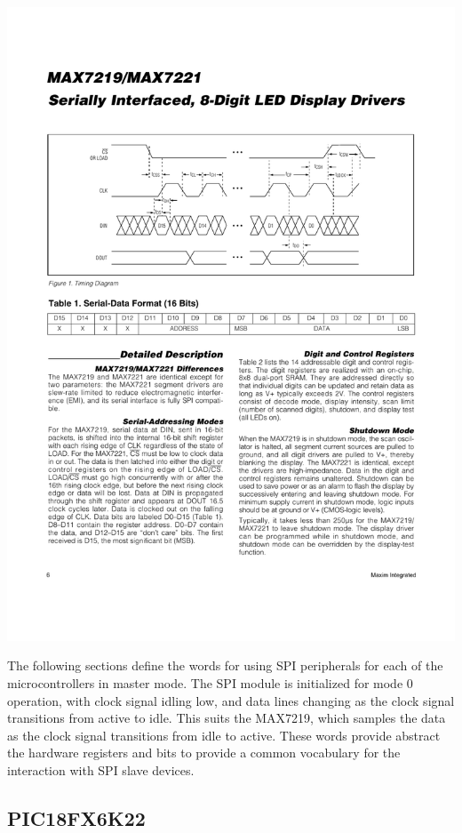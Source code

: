 \documentclass[12pt,a4paper]{article}
\begin{document}
\medskip
\centerline{
\includegraphics[width=\textwidth,viewport=53 407 543 675,clip=true]{../figs/max7219-timing-diagram.pdf}
}

\medskip\noindent
The following sections define the words for using SPI peripherals for each of the microcontrollers 
in master mode.
The SPI module is initialized for mode 0 operation, with clock signal idling low, 
and data lines changing as the clock signal transitions from active to idle. 
This suits the MAX7219, which samples the data as the clock signal transitions from idle to active. 
These words provide abstract the hardware registers and bits to provide a common vocabulary for the interaction
with SPI slave devices.

\subsection{PIC18FX6K22}
%
\end{document}
